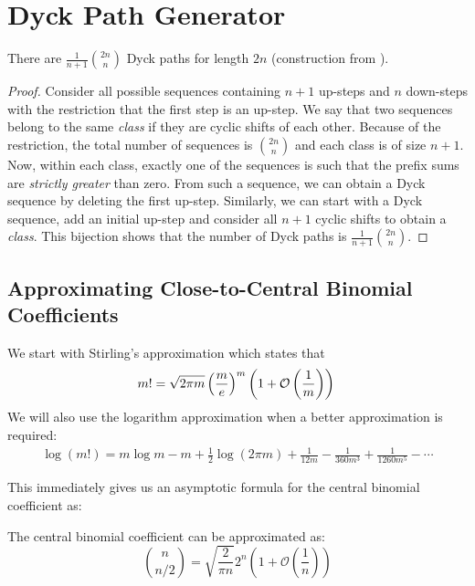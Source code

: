 \section{Dyck Path Generator}%
\label{sec:dyck_appendix}

\begin{theorem}
\label{thm:number_of_dyck_paths}
There are $\frac{1}{n+1}\binom{2n}{n}$ Dyck paths for length $2n$ (construction from \cite{catalan_book}).
\end{theorem}
\begin{proof}
Consider all possible sequences containing $n+1$ up-steps and $n$ down-steps with the restriction that the first step is an up-step.
We say that two sequences belong to the same \emph{class} if they are cyclic shifts of each other.
Because of the restriction, the total number of sequences is $\binom{2n}{n}$ and each class is of size $n+1$.
Now, within each class, exactly one of the sequences is such that the prefix sums are \emph{strictly greater} than zero.
From such a sequence, we can obtain a Dyck sequence by deleting the first up-step.
Similarly, we can start with a Dyck sequence, add an initial up-step and consider all $n+1$ cyclic shifts to obtain a \emph{class}.
This bijection shows that the number of Dyck paths is $ \frac{1}{n+1} \binom{2n}{n}$.
\end{proof}



\subsection{Approximating Close-to-Central Binomial Coefficients}%
\label{sec:approximating_close_to_central_binomial_coefficients}
We start with Stirling's approximation which states that
\[
m! = \sqrt{2\pi m}\left( \frac me\right)^m\left( 1 + \mathcal O\left( \frac 1m\right)\right)\\
\]
We will also use the logarithm approximation when a better approximation is required:
\begin{align}
    \label{eq:log_factorial_approximation}
\log (m!) = m\log m -m + \frac 12 \log(2\pi m) + \frac{1}{12m} - \frac{1}{360m^3} + \frac{1}{1260m^5} - \cdots
\end{align}

This immediately gives us an asymptotic formula for the central binomial coefficient as:
\begin{lemma}
\label{lem:central_binomial_coefficient}
The central binomial coefficient can be approximated as:
\[
\binom{n}{n/2} = \sqrt{\frac{2}{\pi n}}2^n\left( 1 + \mathcal O\left( \frac 1n\right)\right)
\]
\end{lemma}

